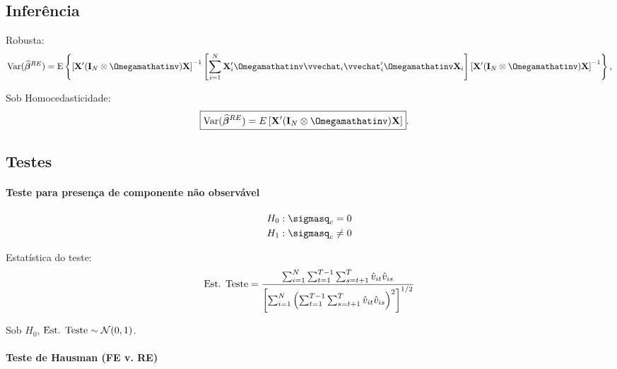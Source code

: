 \documentclass[11pt, oneside, a4paper, article]{article}
\numberwithin{equation}{section}
\begin{document}
\begin{description}
\subsection{Inferência}

Robusta:
\begin{align*} 
\Var( \betavechat^{RE} ) = 
\E \left\{ 
\left[ \Xmat' ( \Imat_{N} \otimes \Omegamathatinv ) \Xmat \right]^{-1}
\left[ \sum_{i=1}^{N}
\Xmat_{i}'\Omegamathatinv\vvechat_{i} \vvechat_{i}' \Omegamathatinv \Xmat_{i} \right]
\left[ \Xmat' ( \Imat_{N} \otimes \Omegamathatinv ) \Xmat \right]^{-1}
\right\},
\end{align*}

Sob Homocedasticidade:
\begin{align*} 
\Aboxed{
\Var( \betavechat^{RE} ) = 
E
\left[ \Xmat' ( \Imat_{N} \otimes \Omegamathatinv ) \Xmat \right] }.
\end{align*}

\subsection{Testes}

\paragraph{Teste para presença de componente não observável}

\begin{align*}
H_{0}&: \sigmasq_{c} = 0
\\     
H_{1}&: \sigmasq_{c} \neq 0
\end{align*}

Estatística do teste:
\begin{align*}
\text{Est. Teste} =
\dfrac{ \sum_{i=1}^{N} \sum_{t=1}^{T-1} \sum_{s=t+1}^{T} \hat{v}_{it}\hat{v}_{is} }
{\left[ \sum_{i=1}^{N} \left(  \sum_{t=1}^{T-1} \sum_{s=t+1}^{T} \hat{v}_{it}\hat{v}_{is} \right)^{2} \right]^{1/2}}
\end{align*}

\noindent
Sob $H_{0}$, $\text{Est. Teste} \sim \mathcal{N}(0,1)$.


\paragraph{Teste de Hausman (FE v. RE)}


\end{description}
\end{document}
